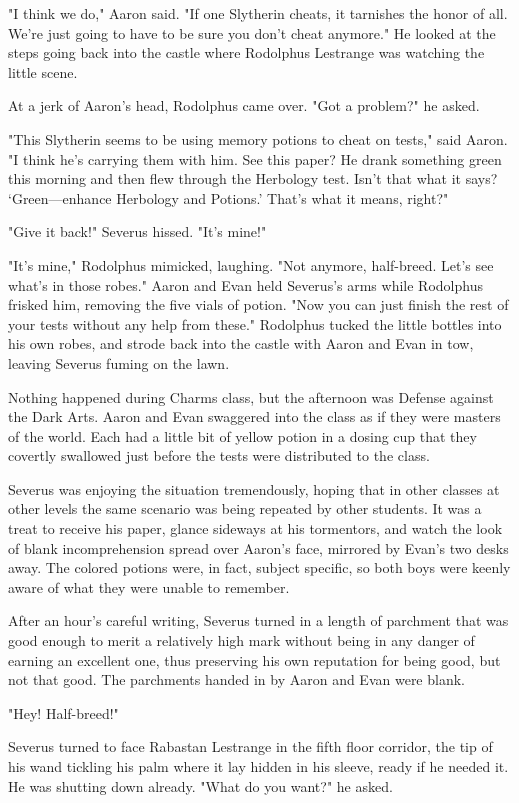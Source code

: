 "I think we do," Aaron said. "If one Slytherin cheats, it tarnishes the honor of all. We're just going to have to be sure you don't cheat anymore." He looked at the steps going back into the castle where Rodolphus Lestrange was watching the little scene.

At a jerk of Aaron's head, Rodolphus came over. "Got a problem?" he asked.

"This Slytherin seems to be using memory potions to cheat on tests," said Aaron. "I think he's carrying them with him. See this paper? He drank something green this morning and then flew through the Herbology test. Isn't that what it says? `Green—enhance Herbology and Potions.' That's what it means, right?"

"Give it{\el} back!" Severus hissed. "It's{\el} mine!"

"It's{\el} mine," Rodolphus mimicked, laughing. "Not anymore, half-breed. Let's see what's in those robes." Aaron and Evan held Severus's arms while Rodolphus frisked him, removing the five vials of potion. "Now you can just finish the rest of your tests without any help from these." Rodolphus tucked the little bottles into his own robes, and strode back into the castle with Aaron and Evan in tow, leaving Severus fuming on the lawn.

Nothing happened during Charms class, but the afternoon was Defense against the Dark Arts. Aaron and Evan swaggered into the class as if they were masters of the world. Each had a little bit of yellow potion in a dosing cup that they covertly swallowed just before the tests were distributed to the class.

Severus was enjoying the situation tremendously, hoping that in other classes at other levels the same scenario was being repeated by other students. It was a treat to receive his paper, glance sideways at his tormentors, and watch the look of blank incomprehension spread over Aaron's face, mirrored by Evan's two desks away. The colored potions were, in fact, subject specific, so both boys were keenly aware of what they were unable to remember.

After an hour's careful writing, Severus turned in a length of parchment that was good enough to merit a relatively high mark without being in any danger of earning an excellent one, thus preserving his own reputation for being good, but not that good. The parchments handed in by Aaron and Evan were blank.

"Hey! Half-breed!"

Severus turned to face Rabastan Lestrange in the fifth floor corridor, the tip of his wand tickling his palm where it lay hidden in his sleeve, ready if he needed it. He was shutting down already. "What do you want?" he asked.

